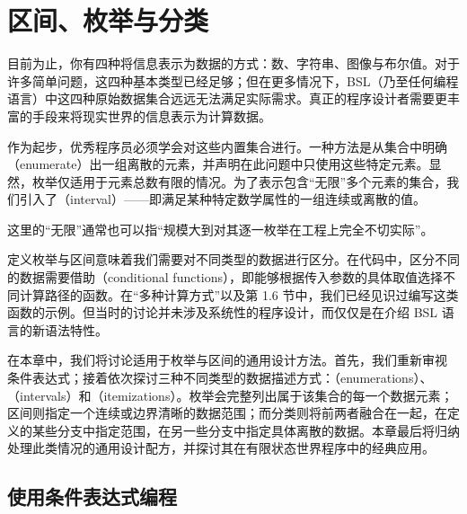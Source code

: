 
\chapter{区间、枚举与分类}
\label{sec:ch04_intervals}

目前为止，你有四种将信息表示为数据的方式：数、字符串、图像与布尔值。对于许多简单问题，这四种基本类型已经足够；但在更多情况下，BSL（乃至任何编程语言）中这四种原始数据集合远远无法满足实际需求。真正的程序设计者需要更丰富的手段来将现实世界的信息表示为计算数据。

作为起步，优秀程序员必须学会对这些内置集合进行。一种方法是从集合中明确（enumerate）出一组离散的元素，并声明在此问题中只使用这些特定元素。显然，枚举仅适用于元素总数有限的情况。为了表示包含“无限”多个元素的集合，我们引入了（interval）——即满足某种特定数学属性的一组连续或离散的值。

\begin{notebox}[关于“无限”的说明]
这里的“无限”通常也可以指“规模大到对其逐一枚举在工程上完全不切实际”。
\end{notebox}

定义枚举与区间意味着我们需要对不同类型的数据进行区分。在代码中，区分不同的数据需要借助（conditional functions），即能够根据传入参数的具体取值选择不同计算路径的函数。在“多种计算方式”以及第 1.6 节中，我们已经见识过编写这类函数的示例。但当时的讨论并未涉及系统性的程序设计，而仅仅是在介绍 BSL 语言的新语法特性。

在本章中，我们将讨论适用于枚举与区间的通用设计方法。首先，我们重新审视  条件表达式；接着依次探讨三种不同类型的数据描述方式：（enumerations）、（intervals）和（itemizations）。枚举会完整列出属于该集合的每一个数据元素；区间则指定一个连续或边界清晰的数据范围；而分类则将前两者融合在一起，在定义的某些分支中指定范围，在另一些分支中指定具体离散的数据。本章最后将归纳处理此类情况的通用设计配方，并探讨其在有限状态世界程序中的经典应用。

\section{使用条件表达式编程}
\label{sec:4.1_programming_with_conditionals}

